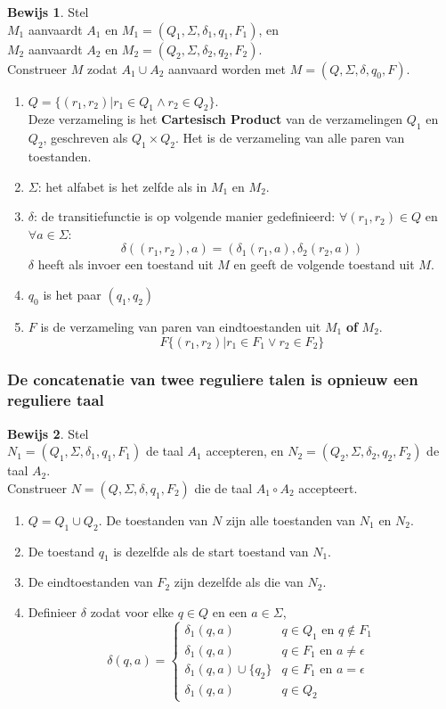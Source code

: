 \documentclass[12pt,a4paper]{article}
\theoremstyle{definition}
\newtheorem{bewijs}{Bewijs}[section]
\begin{document}
\begin{bewijs}
Stel \\
$M_1$ aanvaardt $A_1$ en $M_1 = (Q_1,\Sigma,\delta_1,q_1,F_1)$, en \\
$M_2$ aanvaardt $A_2$ en $M_2 = (Q_2,\Sigma,\delta_2,q_2,F_2)$.\\

Construeer $M$ zodat $A_1 \cup A_2$ aanvaard worden met $M = (Q,\Sigma,\delta,q_0,F)$.\\
\begin{enumerate}
\item $Q=\{(r_1,r_2)|r_1 \in Q_1 \wedge r_2 \in Q_2\}$.\\
Deze verzameling is het \textbf{Cartesisch Product} van de verzamelingen $Q_1$ en $Q_2$, geschreven als $Q_1 \times Q_2$. Het is de verzameling van alle paren van toestanden.
\item $\Sigma$: het alfabet is het zelfde als in $M_1$ en $M_2$.
\item $\delta$: de transitiefunctie is op volgende manier gedefinieerd: $\forall (r_1,r_2) \in Q$ en $\forall a\in \Sigma$: 
$$\delta((r_1,r_2),a) = (\delta_1(r_1,a),\delta_2(r_2,a))$$
$\delta$ heeft als invoer een toestand uit $M$ en geeft de volgende toestand uit $M$.
\item $q_0$ is het paar $(q_1,q_2)$
\item $F$ is de verzameling van paren van eindtoestanden uit $M_1$ \textbf{of} $M_2$. $$F  \{(r_1,r_2)|r_1\in F_1 \vee r_2 \in F_2\}$$
\end{enumerate}
\end{bewijs}
\subsubsection{De concatenatie van twee reguliere talen is opnieuw een reguliere taal}
\begin{bewijs}
Stel\\
 $N_1 = (Q_1,\Sigma,\delta_1,q_1,F_1)$ de taal $A_1$ accepteren,
  en $N_2 = (Q_2,\Sigma,\delta_2,q_2,F_2)$ de taal $A_2$.\\

Construeer $N=(Q,\Sigma,\delta,q_1,F_2)$ die de taal $A_1 \circ A_2$ accepteert.
\begin{enumerate}
\item $Q=Q_1\cup Q_2$. De toestanden van $N$ zijn alle toestanden van $N_1$ en $N_2$.
\item De toestand $q_1$ is dezelfde als de start toestand van $N_1$.
\item De eindtoestanden van $F_2$ zijn dezelfde als die van $N_2$.
\item Definieer $\delta$ zodat voor elke $q \in Q$ en een $a\in\Sigma$,
$$
\delta(q,a) = \left\{
    \begin{array}{ll}
        \delta_1(q,a) & q\in Q_1 \text{ en } q\notin F_1 \\
        \delta_1(q,a) & q\in F_1 \text{ en } a\neq \epsilon \\
        \delta_1(q,a)\cup \{q_2\} & q\in F_1 \text{ en } a=\epsilon \\
        \delta_1(q,a) & q\in Q_2
    \end{array}
\right.
$$
\end{enumerate}
\end{bewijs}
\end{document}
